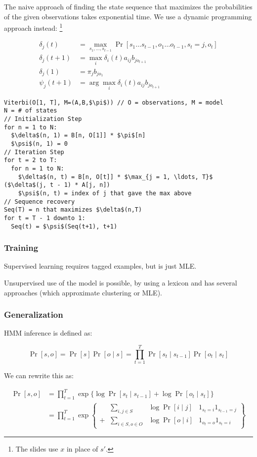 \documentclass{idc_msc}
\begin{document}
The naive approach of finding the state sequence that maximizes the probabilities of the given observations takes exponential time.
We use a dynamic programming approach instead:
\footnote{The slides use \(x\) in place of \(s'\).}

\[
\begin{aligned}
  \delta_j(t) &= \max_{s_1, \ldots, s_{t-1}} \Pr[s_1\ldots s_{t-1}, o_1 \ldots o_{t-1}, s_t = j, o_t] \\
  \delta_j(t+1) &= \max_i \delta_i(t) a_{ij}b_{jo_{t+1}} \\
  \delta_j(1) &= \pi_j b_{jo_1} \\
  \psi_j(t+1) &= \arg\max_i \delta_i(t) a_{ij} b_{j o_{t+1}}
\end{aligned}
\]

\begin{lstlisting}[title={Viterbi decoding}]
Viterbi(O[1, T], M=(A,B,$\pi$)) // O = observations, M = model
N = # of states
// Initialization Step
for n = 1 to N:
  $\delta$(n, 1) = B[n, O[1]] * $\pi$[n]
  $\psi$(n, 1) = 0
// Iteration Step
for t = 2 to T:
  for n = 1 to N:
    $\delta$(n, t) = B[n, O[t]] * $\max_{j = 1, \ldots, T}$ ($\delta$(j, t - 1) * A[j, n])
    $\psi$(n, t) = index of j that gave the max above
// Sequence recovery
Seq(T) = n that maximizes $\delta$(n,T)
for t = T - 1 downto 1:
  Seq(t) = $\psi$(Seq(t+1), t+1)
\end{lstlisting}

\subsubsection{Training}

Supervised learning requires tagged examples, but is just MLE.

Unsupervised use of the model is possible, by using a lexicon and has several approaches (which approximate clustering or MLE).

\subsubsection{Generalization}

HMM inference is defined as:

\[
  \Pr[s, o] = \Pr[s] \Pr[o \mid s] = \prod_{t=1}^T \Pr[s_t \mid s_{t-1}] \Pr[o_t \mid s_t]
\]

We can rewrite this as:

\[
\begin{aligned}
  \Pr[s, o] &= \prod_{t = 1}^T \exp\{\log \Pr[s_t \mid s_{t-1}] + \log \Pr[o_t \mid s_t]\} \\
  &= \prod_{t=1}^T \exp \left\{\begin{matrix}
    &\sum\limits_{i,j \in S} &\log \Pr[i \mid j] & 1_{s_t=i} 1_{s_{t-1} = j} \\
    +& \sum\limits_{i\in S, o \in O} &\log \Pr[o \mid i] & 1_{o_t = o} 1_{s_t = i}
  \end{matrix}\right\}
\end{aligned}
\]
\end{document}
